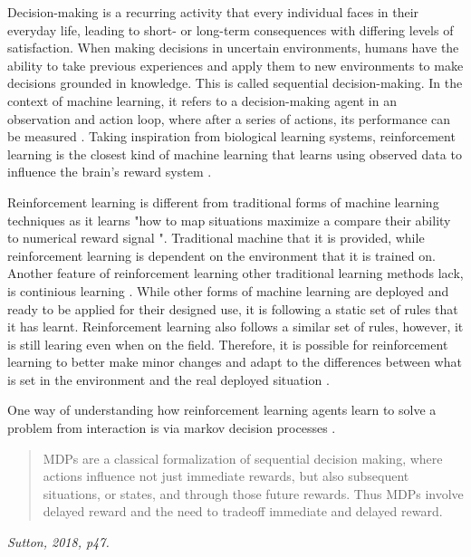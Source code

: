 Decision-making is a recurring activity that every individual faces in their everyday life, leading to short- or long-term consequences with differing levels of satisfaction. When making decisions in uncertain environments, humans have the ability to take previous experiences and apply them to new environments to make decisions grounded in knowledge. This is called sequential decision-making. In the context of machine learning, it refers to a decision-making agent in an observation and action loop, where after a series of actions, its performance can be measured \cite{francon2020effective}. Taking inspiration from biological learning systems, reinforcement learning is the closest kind of machine learning that learns using observed data to influence the brain's reward system \cite{Sutton1}. 

Reinforcement learning is different from traditional forms of machine learning techniques as it learns "how to map situations maximize a compare their ability to numerical reward signal \cite{Sutton1}". Traditional machine that     it is provided, while reinforcement learning is dependent on the environment that it is trained on. Another feature of reinforcement learning other traditional learning methods lack, is continious learning \cite{sreenivas2022safe}. While other forms of machine learning are deployed and ready to be applied for their designed use, it is following a static set of rules that it has learnt. Reinforcement learning also follows a similar set of rules, however, it is still learing even when on the field. Therefore, it is possible for reinforcement learning to better make minor changes and adapt to the differences between what is set in the environment and the real deployed situation \cite{sreenivas2022safe}.

One way of understanding how reinforcement learning agents learn to solve a problem from interaction is via markov decision processes \cite{Sutton1}.

\begin{quote}
MDPs are a classical formalization of sequential decision making,
where actions influence not just immediate rewards, but also subsequent situations, or
states, and through those future rewards. Thus MDPs involve delayed reward and the
need to tradeoff immediate and delayed reward.
\end{quote}
\hspace*{\fill} \textit{Sutton, 2018, p47.}

